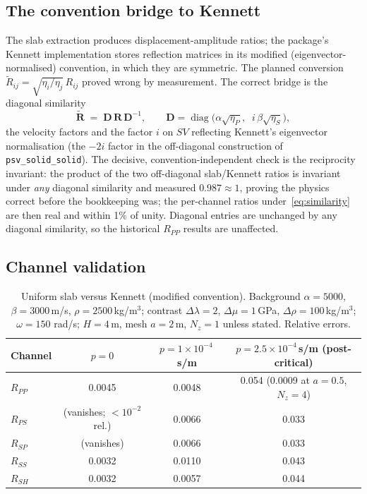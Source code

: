 \documentclass[11pt,a4paper]{article}
\newcommand{\Dlam}{\Delta\lambda}
\newcommand{\Dmu}{\Delta\mu}
\newcommand{\Drho}{\Delta\rho}
\newcommand{\etaP}{\eta_{P}}
\newcommand{\etaS}{\eta_{S}}
\newcommand{\Rpsv}{\mathbf{R}}
\newcommand{\code}[1]{\texttt{#1}}
\begin{document}
\subsection{The convention bridge to Kennett}
\label{sec:convention}

The slab extraction produces displacement-amplitude ratios; the package's
Kennett implementation stores reflection matrices in its modified
(eigenvector-normalised) convention, in which they are symmetric.  The
planned conversion $\tilde{R}_{ij} = \sqrt{\eta_i/\eta_j}\,R_{ij}$
proved wrong by measurement.  The correct bridge is the diagonal
similarity
\begin{equation}
  \tilde{\Rpsv} \;=\; \mathbf{D}\,\Rpsv\,\mathbf{D}^{-1},
  \qquad
  \mathbf{D} = \operatorname{diag}\!\bigl(
     \alpha\sqrt{\etaP},\;\; i\,\beta\sqrt{\etaS}\bigr),
  \label{eq:similarity}
\end{equation}
the velocity factors and the factor $i$ on $SV$ reflecting Kennett's
eigenvector normalisation (the $-2i$ factor in the off-diagonal
construction of \code{psv\_solid\_solid}).  The decisive,
convention-independent check is the reciprocity invariant: the product
of the two off-diagonal slab/Kennett ratios is invariant under
\emph{any} diagonal similarity and measured $0.987 \approx 1$, proving
the physics correct before the bookkeeping was; the per-channel ratios
under~\eqref{eq:similarity} are then real and within 1\% of unity.
Diagonal entries are unchanged by any diagonal similarity, so the
historical $R_{PP}$ results are unaffected.

\subsection{Channel validation}

\begin{table}[ht]
\centering
\caption{Uniform slab versus Kennett (modified convention).  Background
$\alpha = 5000$, $\beta = 3000$\,m/s, $\rho = 2500$\,kg/m$^3$; contrast
$\Dlam = 2$, $\Dmu = 1$\,GPa, $\Drho = 100$\,kg/m$^3$; $\omega = 150$
rad/s; $H = 4$\,m, mesh $a = 2$\,m, $N_z = 1$ unless stated.  Relative
errors.}
\label{tab:channels}
\begin{tabular}{lccc}
\toprule
Channel & $p = 0$ & $p = 1{\times}10^{-4}$\,s/m
        & $p = 2.5{\times}10^{-4}$\,s/m (post-critical) \\
\midrule
$R_{PP}$ & 0.0045 & 0.0048 & 0.054 \quad(0.0009 at $a{=}0.5$, $N_z{=}4$) \\
$R_{PS}$ & (vanishes; $<10^{-2}$ rel.) & 0.0066 & 0.033 \\
$R_{SP}$ & (vanishes) & 0.0066 & 0.033 \\
$R_{SS}$ & 0.0032 & 0.0110 & 0.043 \\
$R_{SH}$ & 0.0032 & 0.0057 & 0.044 \\
\bottomrule
\end{tabular}
\end{table}
\end{document}
